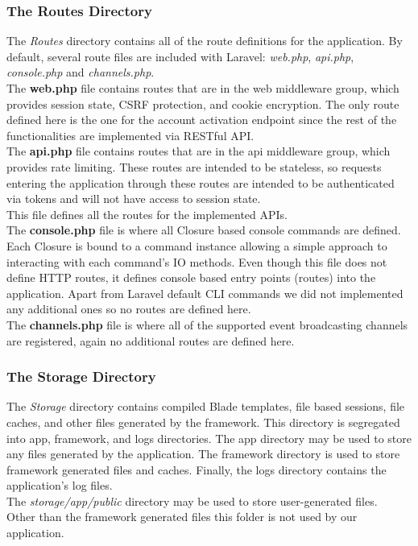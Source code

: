 \subsubsection*{The Routes Directory}
The \textit{Routes} directory contains all of the route definitions for the application. By default, several route files are included with Laravel: \textit{web.php}, \textit{api.php}, \textit{console.php} and \textit{channels.php}.\\
The \textbf{web.php} file contains routes that are in the web middleware group, which provides session state, CSRF protection, and cookie encryption. The only route defined here is the one for the account activation endpoint since the rest of the functionalities are implemented via RESTful API.\\
The \textbf{api.php} file contains routes that are in the api middleware group, which provides rate limiting. These routes are intended to be stateless, so requests entering the application through these routes are intended to be authenticated via tokens and will not have access to session state. \\
This file defines all the routes for the implemented APIs.\\
The \textbf{console.php} file is where all Closure based console commands are defined. Each Closure is bound to a command instance allowing a simple approach to interacting with each command's IO methods. Even though this file does not define HTTP routes, it defines console based entry points (routes) into the application. Apart from Laravel default CLI commands we did not implemented any additional ones so no routes are defined here.\\
The \textbf{channels.php} file is where all of the supported event broadcasting channels are registered, again no additional routes are defined here.

\subsubsection*{The Storage Directory}
The \textit{Storage} directory contains compiled Blade templates, file based sessions, file caches, and other files generated by the framework. This directory is segregated into app, framework, and  logs directories. The app directory may be used to store any files generated by the application. The framework directory is used to store framework generated files and caches. Finally, the logs directory contains the application's log files.\\
The \textit{storage/app/public} directory may be used to store user-generated files.\\
Other than the framework generated files this folder is not used by our application.

